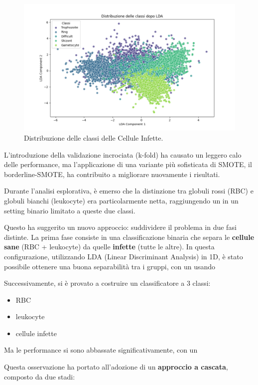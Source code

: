 \documentclass[minted, draw]{../tex/hebdomon}
\begin{document}
% 
\begin{figure}[H]
  \centering
  \includegraphics[width=.8\linewidth]{figures/lda_distribution.png}
  \caption{Distribuzione delle classi delle Cellule Infette.}
  \label{fig:lda_infette}
\end{figure}
%


L’introduzione della validazione incrociata (k-fold) ha causato un leggero calo delle performance, ma l’applicazione di una variante più sofisticata di SMOTE, il borderline-SMOTE, ha contribuito a migliorare nuovamente i risultati.

Durante l'analisi esplorativa, è emerso che la distinzione tra globuli rossi (RBC) e globuli bianchi (leukocyte) era particolarmente netta, raggiungendo un  in un setting binario limitato a queste due classi. 

Questo ha suggerito un nuovo approccio: suddividere il problema in due fasi distinte. La prima fase consiste in una classificazione binaria che separa le \textbf{cellule sane} (RBC + leukocyte) da quelle \textbf{infette} (tutte le altre). In questa configurazione, utilizzando LDA (Linear Discriminant Analysis) in 1D, è stato possibile ottenere una buona separabilità tra i gruppi, con un  usando 

Successivamente, si è provato a costruire un classificatore a 3 classi:
\begin{itemize}
	\item RBC
	\item leukocyte
	\item cellule infette 
\end{itemize}

Ma le performance si sono abbassate significativamente, con un  

Questa osservazione ha portato all’adozione di un \textbf{approccio a cascata}, composto da due stadi:
\end{document}
